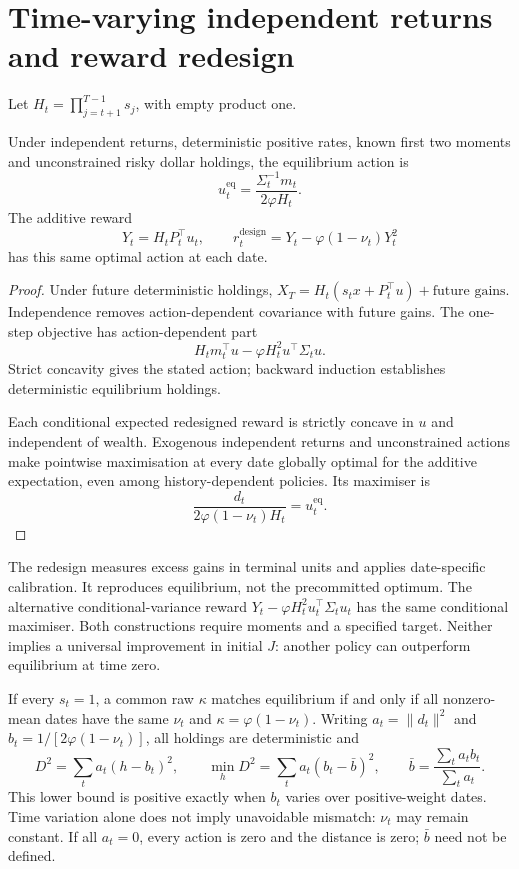 \section{Time-varying independent returns and reward redesign}
\label{app:redesign}
Let $H_t=\prod_{j=t+1}^{T-1}s_j$, with empty product one.
\begin{proposition}
Under independent returns, deterministic positive rates, known first two
moments and unconstrained risky dollar holdings, the equilibrium action is
\[
 u_t^{\mathrm{eq}}=\frac{\Sigma_t^{-1}m_t}{2\varphi H_t}.
\]
The additive reward
\[
 Y_t=H_tP_t^{\top}u_t,\qquad
 r_t^{\mathrm{design}}=Y_t-\varphi(1-\nu_t)Y_t^2
\]
has this same optimal action at each date.
\end{proposition}
\begin{proof}
Under future deterministic holdings,
$X_T=H_t(s_tx+P_t^{\top}u)+\text{future gains}$.
Independence removes action-dependent covariance with future gains. The
one-step objective has action-dependent part
\[
 H_tm_t^{\top}u-\varphi H_t^2u^{\top}\Sigma_tu.
\]
Strict concavity gives the stated action; backward induction establishes
deterministic equilibrium holdings.

Each conditional expected redesigned reward is strictly concave in $u$ and
independent of wealth. Exogenous independent returns and unconstrained actions
make pointwise maximisation at every date globally optimal for the additive
expectation, even among history-dependent policies. Its maximiser is
\[
 \frac{d_t}{2\varphi(1-\nu_t)H_t}=u_t^{\mathrm{eq}}.
\]
\end{proof}
The redesign measures excess gains in terminal units and applies date-specific
calibration. It reproduces equilibrium, not the precommitted optimum. The
alternative conditional-variance reward
$Y_t-\varphi H_t^2u_t^{\top}\Sigma_tu_t$ has the same conditional maximiser.
Both constructions require moments and a specified target. Neither implies a
universal improvement in initial $J$: another policy can outperform equilibrium
at time zero.

If every $s_t=1$, a common raw $\kappa$ matches equilibrium if and only if all
nonzero-mean dates have the same $\nu_t$ and $\kappa=\varphi(1-\nu_t)$.
Writing $a_t=\|d_t\|^2$ and $b_t=1/[2\varphi(1-\nu_t)]$, all holdings are
deterministic and
\[
 D^2=\sum_ta_t(h-b_t)^2,\qquad
 \min_hD^2=\sum_ta_t(b_t-\bar b)^2,\qquad
 \bar b=\frac{\sum_ta_tb_t}{\sum_ta_t}.
\]
This lower bound is positive exactly when $b_t$ varies over positive-weight
dates. Time variation alone does not imply unavoidable mismatch: $\nu_t$ may
remain constant. If all $a_t=0$, every action is zero and the distance is zero;
$\bar b$ need not be defined.

